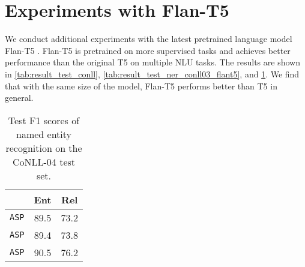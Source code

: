 \documentclass[11pt]{article}
\begin{document}
\section{Experiments with Flan-T5}
We conduct additional experiments with the latest pretrained language model Flan-T5 \cite{flant5}. Flan-T5 is pretrained on more supervised tasks and achieves better performance than the original T5 on multiple NLU tasks. 
The results are shown in \cref{tab:result_test_conll}, \cref{tab:result_test_ner_conll03_flant5}, and \cref{tab:result_test_ere_conll04_flant5}. We find that with the same size of the model, Flan-T5 performs better than T5 in general.

\begin{table}[t]
\centering
{} 
\caption{Test F1 scores of named entity recognition on the CoNLL-03 test set.}
\label{tab:result_test_ner_conll03_flant5}
\end{table}






\begin{table}[t]
\centering

\begin{tabular}{lcc}
\toprule
             & Ent & Rel \\ \midrule
\texttt{ASP} & 89.5 & 73.2\\ 
{\texttt{ASP}} & 89.4 & 73.8\\ 
{\texttt{ASP}} & 90.5 & 76.2 \\ \bottomrule
\end{tabular}
\caption{Test F1 scores of named entity recognition on the CoNLL-04 test set.}
\label{tab:result_test_ere_conll04_flant5}
\end{table}
\end{document}
